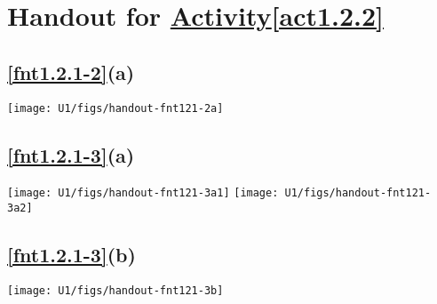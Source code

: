 \section{Handout for \hyperref[act1.2.2]{Activity\about\ref*{act1.2.2}}}

\subsection*{\ref{fnt1.2.1-2}(a)}

\noindent
\texttt{[image: U1/figs/handout-fnt121-2a]}

\subsection*{\ref{fnt1.2.1-3}(a)}

\noindent
\texttt{[image: U1/figs/handout-fnt121-3a1]}
\;
\texttt{[image: U1/figs/handout-fnt121-3a2]}

\subsection*{\ref{fnt1.2.1-3}(b)}

\noindent
\texttt{[image: U1/figs/handout-fnt121-3b]}